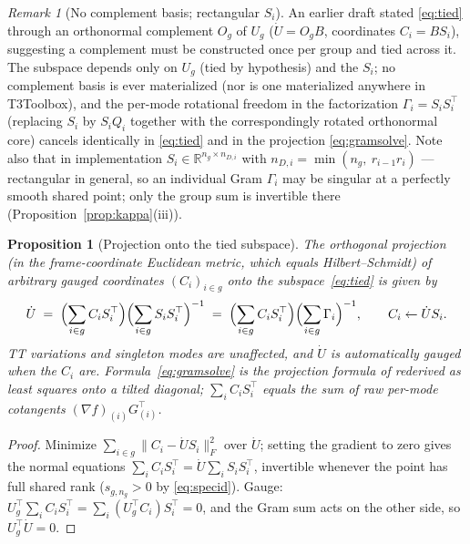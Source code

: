 \documentclass[11pt]{article}
\newtheorem{proposition}[theorem]{Proposition}
\theoremstyle{definition}
\theoremstyle{remark}
\newtheorem{remark}[theorem]{Remark}
\newcommand{\R}{\mathbb{R}}
\begin{document}
\begin{remark}[No complement basis; rectangular $S_i$]
An earlier draft stated \eqref{eq:tied} through an orthonormal complement
$O_g$ of $U_g$ ($\dot U = O_g B$, coordinates $C_i = B S_i$), suggesting a
complement must be constructed once per group and tied across it. The
subspace depends only on $U_g$ (tied by hypothesis) and the $S_i$; no
complement basis is ever materialized (nor is one materialized anywhere in
T3Toolbox), and the per-mode rotational freedom in the factorization
$\Gamma_i = S_i S_i^\top$ (replacing $S_i$ by $S_i Q_i$ together with the
correspondingly rotated orthonormal core) cancels identically in
\eqref{eq:tied} and in the projection \eqref{eq:gramsolve}. Note also that in
implementation $S_i \in \R^{n_g \times n_{D,i}}$ with
$n_{D,i} = \min(n_g,\ r_{i-1} r_i)$ --- rectangular in general, so an
individual Gram $\Gamma_i$ may be singular at a perfectly smooth shared
point; only the group sum is invertible there
(Proposition~\ref{prop:kappa}(iii)).
\end{remark}

\begin{proposition}[Projection onto the tied subspace]\label{prop:proj}
The orthogonal projection (in the frame-coordinate Euclidean metric, which
equals Hilbert--Schmidt) of arbitrary gauged coordinates
$(C_{i})_{i \in g}$ onto the subspace~\eqref{eq:tied} is given by
\begin{equation}\label{eq:gramsolve}
\dot U \;=\; \Bigl(\sum_{i \in g} C_i S_i^\top\Bigr)
        \Bigl(\sum_{i \in g} S_i S_i^\top\Bigr)^{-1}
   \;=\; \Bigl(\sum_{i \in g} C_i S_i^\top\Bigr)
        \Bigl(\sum_{i \in g} \Gamma_i\Bigr)^{-1},
\qquad
C_i \leftarrow \dot U S_i .
\end{equation}
TT variations and singleton modes are unaffected, and $\dot U$ is
automatically gauged when the $C_i$ are. Formula~\eqref{eq:gramsolve}
is the projection formula of \cite[\S 5.3]{MR2026} rederived as least squares
onto a tilted diagonal; $\sum_i C_i S_i^\top$ equals the sum of raw per-mode
cotangents $(\nabla f)_{(i)} G_{(i)}^\top$.
\end{proposition}

\begin{proof}
Minimize $\sum_{i\in g} \| C_i - \dot U S_i \|_F^2$ over $\dot U$; setting the
gradient to zero gives the normal equations
$\sum_i C_i S_i^\top = \dot U \sum_i S_i S_i^\top$, invertible whenever the
point has full shared rank ($s_{g,n_g} > 0$ by \eqref{eq:specid}). Gauge:
$U_g^\top \sum_i C_i S_i^\top = \sum_i (U_g^\top C_i) S_i^\top = 0$, and the
Gram sum acts on the other side, so $U_g^\top \dot U = 0$.
\end{proof}
\end{document}
